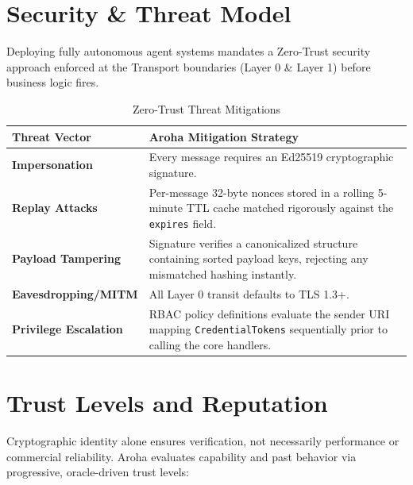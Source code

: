 \documentclass[11pt,a4paper]{article}
\begin{document}
\section{Security \& Threat Model}
Deploying fully autonomous agent systems mandates a Zero-Trust security approach enforced at the Transport boundaries (Layer 0 \& Layer 1) before business logic fires.

\begin{table}[h]
    \centering
    \renewcommand{\arraystretch}{1.4}
    \begin{tabularx}{\textwidth}{@{} l X @{}}
        \toprule
        \textbf{Threat Vector} & \textbf{Aroha Mitigation Strategy} \\
        \midrule
        \textbf{Impersonation} & Every message requires an Ed25519 cryptographic signature. \\
        \textbf{Replay Attacks} & Per-message 32-byte nonces stored in a rolling 5-minute TTL cache matched rigorously against the \texttt{expires} field. \\
        \textbf{Payload Tampering} & Signature verifies a canonicalized structure containing sorted payload keys, rejecting any mismatched hashing instantly. \\
        \textbf{Eavesdropping/MITM} & All Layer 0 transit defaults to TLS 1.3+. \\
        \textbf{Privilege Escalation} & RBAC policy definitions evaluate the sender URI mapping \texttt{CredentialTokens} sequentially prior to calling the core handlers. \\
        \bottomrule
    \end{tabularx}
    \caption{Zero-Trust Threat Mitigations}
\end{table}

\section{Trust Levels and Reputation}
Cryptographic identity alone ensures verification, not necessarily performance or commercial reliability. Aroha evaluates capability and past behavior via progressive, oracle-driven trust levels:
\end{document}
